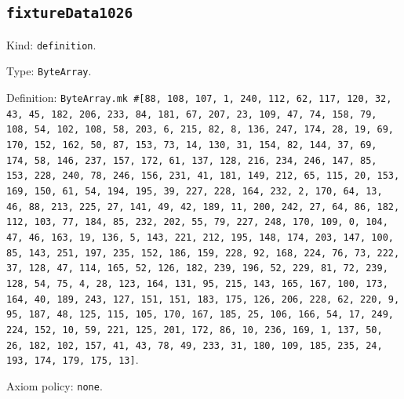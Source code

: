 \documentclass[11pt]{article}
\begin{document}
\subsection*{\texttt{fixtureData1026}}
\noindent Kind: \texttt{definition}.\par
\noindent Type: \texttt{ByteArray}.\par
\noindent Definition: \texttt{ByteArray.mk \#[88, 108, 107, 1, 240, 112, 62, 117, 120, 32, 43, 45, 182, 206, 233, 84, 181, 67, 207, 23, 109, 47, 74, 158, 79, 108, 54, 102, 108, 58, 203, 6, 215, 82, 8, 136, 247, 174, 28, 19, 69, 170, 152, 162, 50, 87, 153, 73, 14, 130, 31, 154, 82, 144, 37, 69, 174, 58, 146, 237, 157, 172, 61, 137, 128, 216, 234, 246, 147, 85, 153, 228, 240, 78, 246, 156, 231, 41, 181, 149, 212, 65, 115, 20, 153, 169, 150, 61, 54, 194, 195, 39, 227, 228, 164, 232, 2, 170, 64, 13, 46, 88, 213, 225, 27, 141, 49, 42, 189, 11, 200, 242, 27, 64, 86, 182, 112, 103, 77, 184, 85, 232, 202, 55, 79, 227, 248, 170, 109, 0, 104, 47, 46, 163, 19, 136, 5, 143, 221, 212, 195, 148, 174, 203, 147, 100, 85, 143, 251, 197, 235, 152, 186, 159, 228, 92, 168, 224, 76, 73, 222, 37, 128, 47, 114, 165, 52, 126, 182, 239, 196, 52, 229, 81, 72, 239, 128, 54, 75, 4, 28, 123, 164, 131, 95, 215, 143, 165, 167, 100, 173, 164, 40, 189, 243, 127, 151, 151, 183, 175, 126, 206, 228, 62, 220, 9, 95, 187, 48, 125, 115, 105, 170, 167, 185, 25, 106, 166, 54, 17, 249, 224, 152, 10, 59, 221, 125, 201, 172, 86, 10, 236, 169, 1, 137, 50, 26, 182, 102, 157, 41, 43, 78, 49, 233, 31, 180, 109, 185, 235, 24, 193, 174, 179, 175, 13]}.\par
\noindent Axiom policy: \texttt{none}.\par
\end{document}
